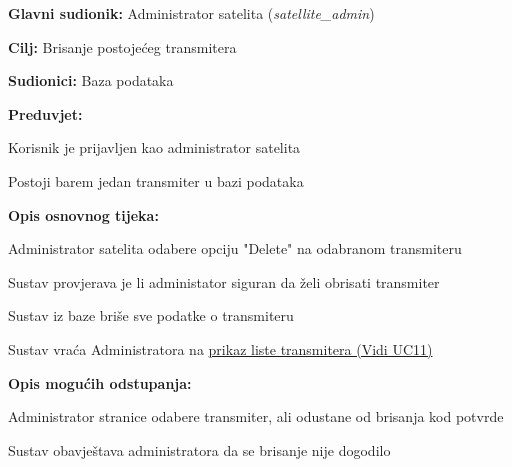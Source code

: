 			\noindent {}
			\begin{packed_item}
				
				\item \textbf{Glavni sudionik: }Administrator satelita (\textit{satellite\_admin})
				\item  \textbf{Cilj: }Brisanje postojećeg transmitera
				\item  \textbf{Sudionici: }Baza podataka
				\item  \textbf{Preduvjet: }
				\begin{packed_enum}
					\item Korisnik je prijavljen kao administrator satelita
					\item Postoji barem jedan transmiter u bazi podataka	\end{packed_enum}
				\item  \textbf{Opis osnovnog tijeka: }
				
				\item[] \begin{packed_enum}
					
					\item Administrator satelita odabere opciju "Delete" na odabranom transmiteru
					\item Sustav provjerava je li administator siguran da želi obrisati transmiter
					\item Sustav iz baze briše sve podatke o transmiteru 
					\item Sustav vraća Administratora na \hyperref[UC11]{prikaz liste transmitera (Vidi UC11) } 
					
				\end{packed_enum}
				
				\item  \textbf{Opis mogućih odstupanja: }
				
				\item[] \begin{packed_enum}
					
					\item[1] Administrator stranice odabere transmiter, ali odustane od brisanja kod potvrde
					\item[ ] \begin{packed_enum}
						
						\item[1.1] Sustav obavještava administratora da se brisanje nije dogodilo
					\end{packed_enum}
				\end{packed_enum}
			\end{packed_item}
